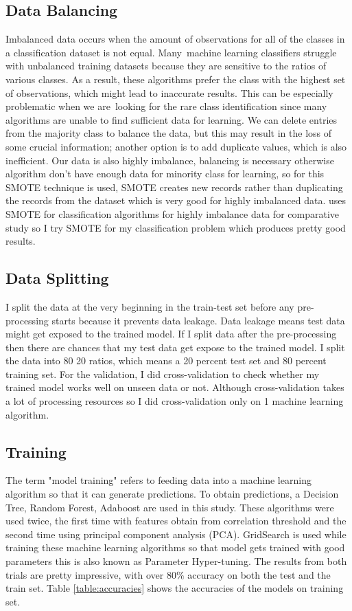 \documentclass[12pt]{article}
\begin{document}
\subsection{Data Balancing}
Imbalanced data occurs when the amount of observations for all of the classes in a classification dataset is not equal. Many machine learning classifiers struggle with unbalanced training datasets because they are sensitive to the ratios of various classes. As a result, these algorithms prefer the class with the highest set of observations, which might lead to inaccurate results. This can be especially problematic when we are looking for the rare class identification since many algorithms are unable to find sufficient data for learning. We can delete entries from the majority class to balance the data, but this may result in the loss of some crucial information; another option is to add duplicate values, which is also inefficient. Our data is also highly imbalance, balancing is necessary otherwise algorithm don't have enough data for minority class for learning, so for this SMOTE technique is used, SMOTE creates new records rather than duplicating the records from the dataset which is very good for highly imbalanced data. \citep{balancing} uses SMOTE for classification algorithms for highly imbalance data for comparative study so I try SMOTE for my classification problem which produces pretty good results.


\subsection{Data Splitting}
I split the data at the very beginning in the train-test set before any pre-processing starts because it prevents data leakage. Data leakage means test data might get exposed to the trained model. If I split data after the pre-processing then there are chances that my test data get expose to the trained model. I split the data into 80 20 ratios, which means a 20 percent test set and 80 percent training set. For the validation, I did cross-validation to check whether my trained model works well on unseen data or not. Although cross-validation takes a lot of processing resources so I did cross-validation only on 1 machine learning algorithm.

\subsection{Training}
The term "model training" refers to feeding data into a machine learning algorithm so that it can generate predictions. To obtain predictions, a Decision Tree, Random Forest, Adaboost are used in this study. These algorithms were used twice, the first time with features obtain from correlation threshold and the second time using principal component analysis (PCA). GridSearch is used while training these machine learning algorithms so that model gets trained with good parameters this is also known as Parameter Hyper-tuning. The results from both trials are pretty impressive, with over 80$\%$ accuracy on both the test and the train set. Table \ref{table:accuracies} shows the accuracies of the models on training set.
\end{document}
